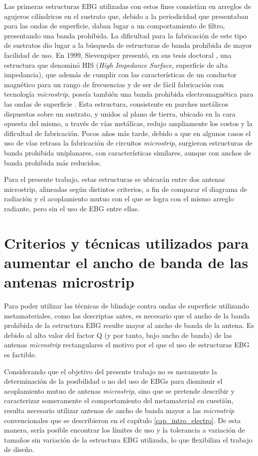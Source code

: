 Las primeras estructuras EBG utilizadas con estos fines consistían en arreglos de agujeros cilíndricos en el sustrato que, debido a la periodicidad que presentaban para las ondas de superficie, daban lugar a un comportamiento de filtro, presentando una banda prohibida. La dificultad para la fabricación de este tipo de sustratos dio lugar a la búsqueda de estructuras de banda prohibida de mayor facilidad de uso. En 1999, Sievenpiper presentó, en sus tesis doctoral \cite{Sievenpiper:Thesis}, una estructura que denominó HIS (\textit{High Impedance Surface}, superficie de alta impedancia), que además de cumplir con las características de un conductor magnético para un rango de frecuencias \cite{Sievenpiper:HIESForbiddenBand} y de ser de fácil fabricación con tecnología \textit{microstrip}, poseía también una banda prohibida electromagnética para las ondas de superficie \cite{Marcela:Tesis}. Esta estructura, consistente en parches metálicos dispuestos sobre un sustrato, y unidos al plano de tierra, ubicado en la cara opuesta del mismo, a través de vías metálicas, redujo ampliamente los costos y la dificultad de fabricación. Pocos años más tarde, debido a que en algunos casos el uso de vías retrasa la fabricación de circuitos \textit{microstrip}, surgieron estructuras de banda prohibida uniplanares, con características similares, aunque con anchos de banda prohibida más reducidos.

Para el presente trabajo, estas estructuras se ubicarán entre dos antenas microstrip, alineadas según distintos criterios, a fin de comparar el diagrama de radiación y el acoplamiento mutuo con el que se logra con el mismo arreglo radiante, pero sin el uso de EBG entre ellas.

\section{Criterios y técnicas utilizados para aumentar el ancho de banda de las antenas microstrip}
\label{sec_aumento_bw}
Para poder utilizar las técnicas de blindaje contra ondas de superficie utilizando metamateriales, como las descriptas antes, es necesario que el ancho de la banda prohibida de la estructura EBG resulte mayor al ancho de banda de la antena. Es debido al alto valor del factor Q (y por tanto, bajo ancho de banda) de las antenas \textit{microstrip} rectangulares el motivo por el que el uso de estructuras EBG es factible.

Considerando que el objetivo del presente trabajo no es meramente la determinación de la posibilidad o no del uso de EBGs para disminuir el acoplamiento mutuo de antenas \textit{microstrip}, sino que se pretende describir y caracterizar someramente el comportamiento del metamaterial en cuestión, resulta necesario utilizar antenas de ancho de banda mayor a las \textit{microstrip} convencionales que se describieron en el capítulo \ref{cap_intro_electro}. De esta manera, sería posible encontrar los límites de uso y la tolerancia a variación de tamaños sin variación de la estructura EBG utilizada, lo que flexibiliza el trabajo de diseño.

